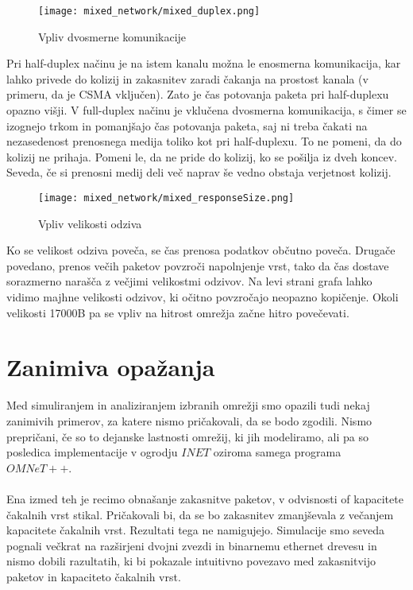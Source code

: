 \begin{figure}[H]
    \centering
    \texttt{[image: mixed\_network/mixed\_duplex.png]}
    \caption{Vpliv dvosmerne komunikacije}
    \label{g05:fig:mixed-duplexMode}
\end{figure}

Pri half-duplex načinu je na istem kanalu možna le enosmerna komunikacija, kar lahko privede do kolizij in zakasnitev zaradi čakanja na prostost kanala (v primeru, da je CSMA vključen). Zato je čas potovanja paketa pri half-duplexu opazno višji. V full-duplex načinu je vklučena dvosmerna komunikacija, s čimer se izognejo trkom in pomanjšajo čas potovanja paketa, saj ni treba čakati na nezasedenost prenosnega medija toliko kot pri half-duplexu. To ne pomeni, da do kolizij ne prihaja. Pomeni le, da ne pride do kolizij, ko se pošilja iz dveh koncev. Seveda, če si prenosni medij deli več naprav še vedno obstaja verjetnost kolizij.

\begin{figure}[H]
    \centering
    \texttt{[image: mixed\_network/mixed\_responseSize.png]}
    \caption{Vpliv velikosti odziva}
    \label{g05:fig:mixed-responseSize}
\end{figure}

Ko se velikost odziva poveča, se čas prenosa podatkov občutno poveča. Drugače povedano, prenos večih paketov povzroči napolnjenje vrst, tako da čas dostave sorazmerno narašča z večjimi velikostmi odzivov. Na levi strani grafa lahko vidimo majhne velikosti odzivov, ki očitno povzročajo neopazno kopičenje. Okoli velikosti 17000B pa se vpliv na hitrost omrežja začne hitro povečevati.

\section{Zanimiva opažanja}

Med simuliranjem in analiziranjem izbranih omrežji smo opazili tudi nekaj zanimivih primerov, za katere nismo pričakovali, da se bodo zgodili. Nismo prepričani, če so to dejanske lastnosti omrežij, ki jih modeliramo, ali pa so posledica implementacije v ogrodju $INET$ oziroma samega programa $OMNeT++$.

\paragraph{}

Ena izmed teh je recimo obnašanje zakasnitve paketov, v odvisnosti of kapacitete čakalnih vrst stikal. Pričakovali bi, da se bo zakasnitev zmanjševala z večanjem kapacitete čakalnih vrst. Rezultati tega ne namigujejo. Simulacije smo seveda pognali večkrat na razširjeni dvojni zvezdi in binarnemu ethernet drevesu in nismo dobili razultatih, ki bi pokazale intuitivno povezavo med zakasnitvijo paketov in kapaciteto čakalnih vrst. 

